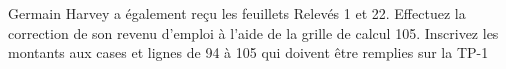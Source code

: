 Germain Harvey a également reçu les feuillets Relevés 1 et 22. Effectuez la correction de son revenu d'emploi à l'aide de la grille de calcul 105. Inscrivez les montants aux cases et lignes de 94 à 105 qui doivent être remplies sur la TP-1
